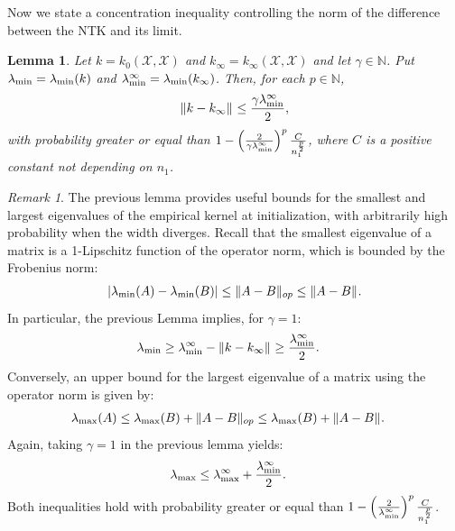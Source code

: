 \documentclass{article}
\newtheorem{lem}[thm]{Lemma}
\theoremstyle{definition}
\theoremstyle{remark}
\newtheorem{rem}[thm]{Remark}
\numberwithin{equation}{section}
\newcommand{\X}{\mathcal{X}}
\newcommand{\N}{\mathbb{N}}
\newcommand{\lammax}{\lambda_{\textup{max}}}
\newcommand{\lammin}{\lambda_{\textup{min}}}
\newcommand{\norm}[2]{
    \|#1\|_{#2}
}
\begin{document}
Now we state a concentration inequality controlling the norm of the difference between the NTK and its limit.
\begin{lem}
    \label{lem:lammin}
    Let $k=k_0(\X,\X)$ and $k_\infty = k_\infty(\X,\X)$ and let $\gamma \in \N$.
    Put $\lammin = \lammin(k)$ and $\lammin^\infty = \lammin(k_\infty)$.
    Then, for each $p\in \N$,
    \begin{align}
        \norm{k-k_\infty}{} \le \frac{\gamma \lammin^\infty}{2},
    \end{align}
    with probability greater or equal than $1 - \left(\frac{2}{\gamma \lammin^\infty}\right)^p\frac{C}{n_1^\frac{p}{2}}$, 
    where $C$ is a positive constant not depending on $n_1$.
\end{lem}
\begin{rem}
    The previous lemma provides useful bounds for the smallest and largest eigenvalues of the empirical kernel at initialization, with arbitrarily high probability when the width diverges.
    Recall that the smallest eigenvalue of a matrix is a 1-Lipschitz function of the operator norm, which is bounded by the Frobenius norm:
    \begin{align}
        \vert \lammin(A) - \lammin(B) \vert \le \norm{A-B}{op} \le \norm{A-B}{}.
    \end{align}
    In particular, the previous Lemma implies, for $\gamma = 1$:
    \begin{align}
        \lammin &\ge \lammin^\infty - \norm{k-k_\infty}{} \ge \frac{\lammin^\infty}{2}.
    \end{align}
    Conversely, an upper bound for the largest eigenvalue of a matrix using the operator norm is given by:
    \begin{align}
        \lammax(A) &\le \lammax(B) + \norm{A-B}{op} \le \lammax(B) + \norm{A-B}{}.
    \end{align}
    Again, taking $\gamma=1$ in the previous lemma yields:
    \begin{align}
        \lammax &\le \lammax^\infty + \frac{\lammin^\infty}{2}.
    \end{align}
    Both inequalities hold with probability greater or equal than $1 - \left(\frac{2}{\lammin^\infty}\right)^p\frac{C}{n_1^\frac{p}{2}}$.
\end{rem}
 
\end{document}
